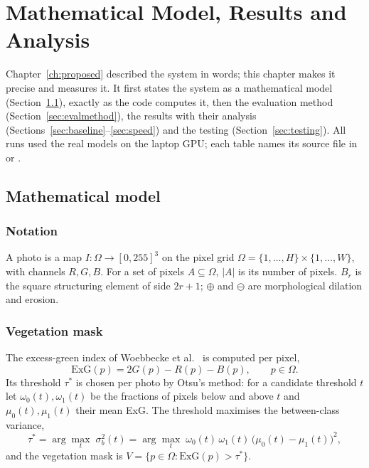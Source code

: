 \chapter{Mathematical Model, Results and Analysis}\label{ch:results}

Chapter~\ref{ch:proposed} described the system in words; this chapter makes it precise and measures it. It
first states the system as a mathematical model (Section~\ref{sec:math}), exactly as the
code computes it, then the evaluation method (Section~\ref{sec:evalmethod}), the results with their
analysis (Sections~\ref{sec:baseline}--\ref{sec:speed}) and the testing (Section~\ref{sec:testing}).
All runs used the real models on the laptop GPU; each table names its source file in
 or .

\section{Mathematical model}\label{sec:math}

\subsection{Notation}
A photo is a map $I:\Omega\to[0,255]^3$ on the pixel grid $\Omega=\{1,\dots,H\}\times\{1,\dots,W\}$,
with channels $R,G,B$. For a set of pixels $A\subseteq\Omega$, $|A|$ is its number of pixels.
$B_r$ is the square structuring element of side $2r+1$; $\oplus$ and $\ominus$ are morphological
dilation and erosion.

\subsection{Vegetation mask}\label{sec:math-veg}
The excess-green index of Woebbecke et al.~\cite{woebbecke1995color} is computed per pixel,
\begin{equation}
  \mathrm{ExG}(p) = 2G(p) - R(p) - B(p), \qquad p\in\Omega .
\end{equation}
Its threshold $\tau^\ast$ is chosen per photo by Otsu's method: for a candidate threshold $t$ let
$\omega_0(t),\omega_1(t)$ be the fractions of pixels below and above $t$ and $\mu_0(t),\mu_1(t)$ their
mean ExG. The threshold maximises the between-class variance,
\begin{equation}
  \tau^\ast = \arg\max_t\; \sigma_b^2(t) = \arg\max_t\; \omega_0(t)\,\omega_1(t)\,\bigl(\mu_0(t)-\mu_1(t)\bigr)^2 ,
\end{equation}
and the vegetation mask is $V=\{p\in\Omega : \mathrm{ExG}(p) > \tau^\ast\}$.

